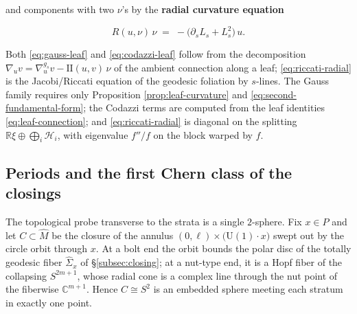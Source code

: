 \documentclass[11pt]{amsart}
\theoremstyle{plain}
\numberwithin{equation}{section}
\theoremstyle{definition}
\theoremstyle{remark}
\begin{document}
and components with two $\nu$'s by the \textbf{radial curvature equation}

\begin{equation}\label{eq:riccati-radial}
	R(u, \nu)\, \nu \;=\; -\big( \partial_s L_s + L_s^2 \big)\, u .
\end{equation}

Both \eqref{eq:gauss-leaf} and \eqref{eq:codazzi-leaf} follow from the decomposition $\nabla_u v = \nabla^{g_s}_u v - \mathrm{II}(u, v)\,\nu$ of the ambient connection along a leaf; \eqref{eq:riccati-radial} is the Jacobi/Riccati equation of the geodesic foliation by $s$-lines. The Gauss family requires only Proposition \ref{prop:leaf-curvature} and \eqref{eq:second-fundamental-form}; the Codazzi terms are computed from the leaf identities \eqref{eq:leaf-connection}; and \eqref{eq:riccati-radial} is diagonal on the splitting $\mathbb{R}\xi \oplus \bigoplus_i \mathcal{H}_i$, with eigenvalue $f''/f$ on the block warped by $f$.

\fi


\subsection{Periods and the first Chern class of the closings}\label{subsec:periods-chern}

The topological probe transverse to the strata is a single $2$-sphere. Fix $x \in P$ and let $C \subset \widehat{M}$ be the closure of the annulus $(0, \ell) \times \big( \mathrm{U}(1) \cdot x \big)$ swept out by the circle orbit through $x$. At a bolt end the orbit bounds the polar disc of the totally geodesic fiber $\widehat{\Sigma}_x$ of \S\ref{subsec:closing}; at a nut-type end, it is a Hopf fiber of the collapsing $S^{2m+1}$, whose radial cone is a complex line through the nut point of the fiberwise $\mathbb{C}^{m+1}$. Hence $C \cong S^2$ is an embedded sphere meeting each stratum in exactly one point.%
\end{document}
